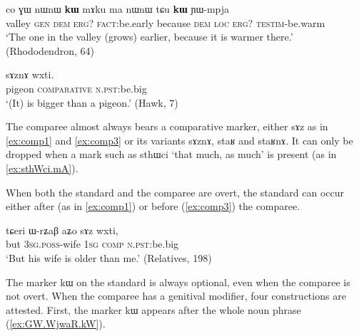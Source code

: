 \documentclass[oldfontcommands,oneside,a4paper,11pt]{article}
\newcommand{\ipa}[1]{{\phon #1}} %
\begin{document}
 \begin{exe}
\ex \label{ex:comp2}
\gll 
\ipa{co}  	\ipa{ɣɯ}  	\ipa{nɯnɯ}  	\ipa{\textbf{kɯ}}  	\ipa{mɤku}  	\ipa{ma}  	\ipa{nɯnɯ} \ipa{tɕu}  	\ipa{\textbf{kɯ}}  	\ipa{ɲɯ-mpja}  \\
valley \textsc{gen} \textsc{dem} \textsc{erg?} \textsc{fact}:be.early because \textsc{dem} \textsc{loc} \textsc{erg?} \textsc{testim}-be.warm \\
\glt `The one in the valley (grows) earlier, because it is warmer there.' (Rhododendron, 64)
\end{exe}

\begin{exe}
\ex \label{ex:comp3}
\gll  \ipa{qɤjdo}  	\ipa{sɤznɤ}  	\ipa{wxti.}     \\
pigeon \textsc{comparative} \textsc{n.pst:}be.big \\
\glt `(It) is bigger than a pigeon.' (Hawk, 7)
\end{exe}


The comparee almost always bears a comparative marker, either \ipa{sɤz} as in \ref{ex:comp1} and \ref{ex:comp3} or its variants \ipa{sɤznɤ}, \ipa{staʁ} and \ipa{staʁnɤ}. It can only be dropped when a mark such as \ipa{sthɯci} `that much, as much' is present (as in \ref{ex:sthWci.mA}).

 When both the standard and the comparee are overt, the standard can occur either after (as in  \ref{ex:comp1}) or before (\ref{ex:comp3}) the comparee.  
 
\begin{exe}
\ex \label{ex:comp3}
\gll 
\ipa{tɕeri}  	\ipa{ɯ-rʑaβ}  	\ipa{aʑo}  	\ipa{sɤz}  	\ipa{wxti,}  \\
but \textsc{3sg.poss}-wife \textsc{1sg} \textsc{comp} \textsc{n.pst:}be.big \\
\glt `But his wife is older than me.' (Relatives, 198)
\end{exe}


The marker \ipa{kɯ} on the standard is always optional, even when the comparee is not overt. When the comparee has a genitival modifier, four constructions are attested. First,  the marker \ipa{kɯ} appears after the whole noun phrase (\ref{ex:GW.WjwaR.kW}). 
\end{document}

